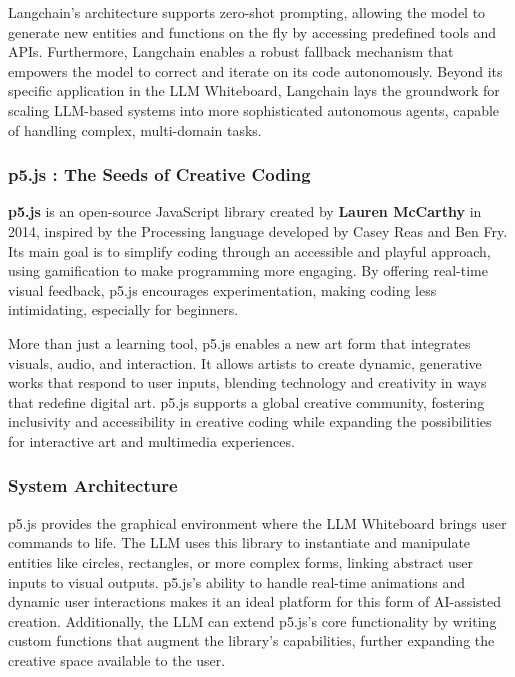 Langchain’s architecture supports zero-shot prompting, allowing the model to generate new entities and functions on the fly by accessing predefined tools and APIs.
Furthermore, Langchain enables a robust fallback mechanism that empowers the model to correct and iterate on its code autonomously. Beyond its specific application in the LLM Whiteboard, Langchain lays the groundwork for scaling LLM-based systems into more sophisticated autonomous agents, capable of handling complex, multi-domain tasks.

\subsubsection{p5.js : The Seeds of Creative Coding}

\textbf{p5.js} is an open-source JavaScript library created by \textbf{Lauren McCarthy} in 2014, inspired by the Processing language developed by Casey Reas and Ben Fry.
Its main goal is to simplify coding through an accessible and playful approach, using gamification to make programming more engaging.
By offering real-time visual feedback, p5.js encourages experimentation, making coding less intimidating, especially for beginners.

More than just a learning tool, p5.js enables a new art form that integrates visuals, audio, and interaction.
It allows artists to create dynamic, generative works that respond to user inputs, blending technology and creativity in ways that redefine digital art.
p5.js supports a global creative community, fostering inclusivity and accessibility in creative coding while expanding the possibilities for interactive art and multimedia experiences.

\subsubsection{System Architecture}

p5.js provides the graphical environment where the LLM Whiteboard brings user commands to life.
The LLM uses this library to instantiate and manipulate entities like circles, rectangles, or more complex forms, linking abstract user inputs to visual outputs.
p5.js’s ability to handle real-time animations and dynamic user interactions makes it an ideal platform for this form of AI-assisted creation.
Additionally, the LLM can extend p5.js's core functionality by writing custom functions that augment the library’s capabilities, further expanding the creative space available to the user.

